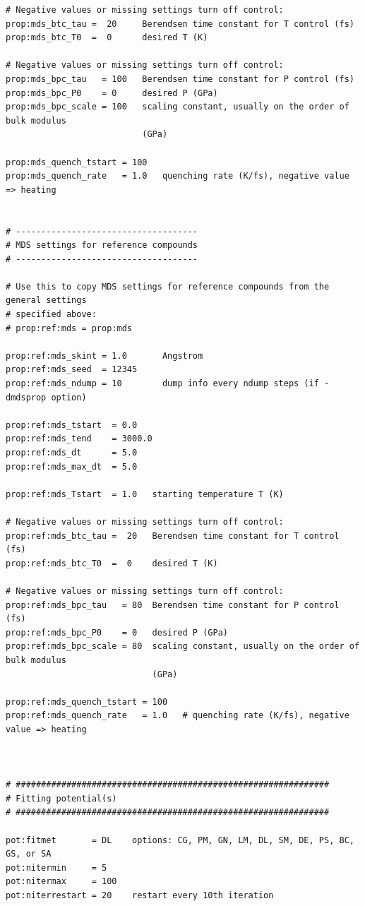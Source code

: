 \documentclass[a4paper,12pt,pdftex,onecolumn]{article}
\begin{document}
\begin{Verbatim}[fontsize=\relsize{-1},frame=single]
# Negative values or missing settings turn off control:
prop:mds_btc_tau =  20     Berendsen time constant for T control (fs)
prop:mds_btc_T0  =  0      desired T (K)

# Negative values or missing settings turn off control:
prop:mds_bpc_tau   = 100   Berendsen time constant for P control (fs)
prop:mds_bpc_P0    = 0     desired P (GPa)
prop:mds_bpc_scale = 100   scaling constant, usually on the order of bulk modulus
                           (GPa)

prop:mds_quench_tstart = 100
prop:mds_quench_rate   = 1.0   quenching rate (K/fs), negative value => heating


# ------------------------------------
# MDS settings for reference compounds
# ------------------------------------

# Use this to copy MDS settings for reference compounds from the general settings
# specified above:
# prop:ref:mds = prop:mds

prop:ref:mds_skint = 1.0       Angstrom
prop:ref:mds_seed  = 12345
prop:ref:mds_ndump = 10        dump info every ndump steps (if -dmdsprop option)

prop:ref:mds_tstart  = 0.0
prop:ref:mds_tend    = 3000.0
prop:ref:mds_dt      = 5.0
prop:ref:mds_max_dt  = 5.0

prop:ref:mds_Tstart  = 1.0   starting temperature T (K)

# Negative values or missing settings turn off control:
prop:ref:mds_btc_tau =  20   Berendsen time constant for T control (fs)
prop:ref:mds_btc_T0  =  0    desired T (K)

# Negative values or missing settings turn off control:
prop:ref:mds_bpc_tau   = 80  Berendsen time constant for P control (fs)
prop:ref:mds_bpc_P0    = 0   desired P (GPa)
prop:ref:mds_bpc_scale = 80  scaling constant, usually on the order of bulk modulus
                             (GPa)

prop:ref:mds_quench_tstart = 100
prop:ref:mds_quench_rate   = 1.0   # quenching rate (K/fs), negative value => heating



# ##############################################################
# Fitting potential(s)
# ##############################################################

pot:fitmet       = DL    options: CG, PM, GN, LM, DL, SM, DE, PS, BC, GS, or SA
pot:nitermin     = 5
pot:nitermax     = 100
pot:niterrestart = 20    restart every 10th iteration


\end{Verbatim}
\end{document}

